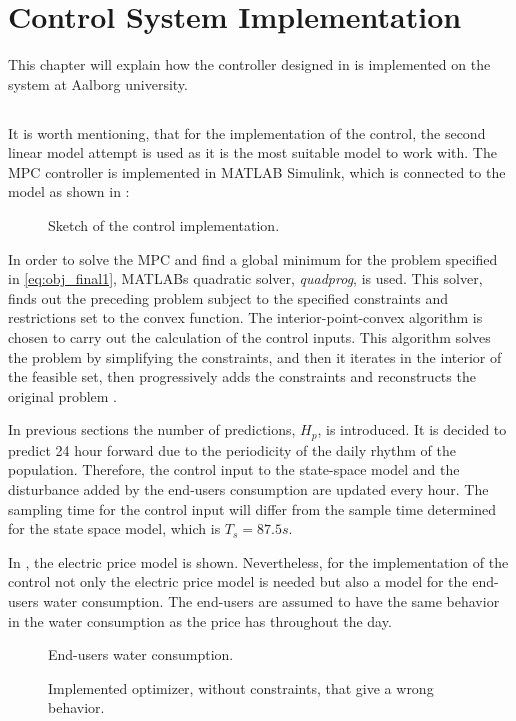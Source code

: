 \chapter{Control System Implementation}
\label{implementation_of_controller}

This chapter will explain how the controller designed in  is implemented on the system at Aalborg university.  

\section{}
It is worth mentioning, that for the implementation of the control, the second linear model attempt is used as it is the most suitable model to work with. The MPC controller is implemented in MATLAB Simulink, which is connected to the model as shown in :

\begin{figure}[H]
\centering
 
\caption{Sketch of the control implementation.}
\label{fig:control_sketch}
\end{figure}

In order to solve the MPC and find a global minimum for the problem specified in \eqref{eq:obj_final1},  MATLABs quadratic solver, \textit{quadprog}, is used. This solver, finds out the preceding problem subject to the specified constraints and restrictions set to the convex function. The interior-point-convex algorithm is chosen to carry out the calculation of the control inputs. This algorithm solves the problem by simplifying the constraints, and then it iterates in the interior of the feasible set, then progressively adds the constraints and reconstructs the original problem \cite{Convex_optimization}. 

In previous sections the number of predictions, $H_p$, is introduced. It is decided to predict 24 hour forward due to the periodicity of the daily rhythm of the population. Therefore, the control input to the state-space model and the disturbance added by the end-users consumption are updated every hour. The sampling time for the control input will differ from the sample time determined for the state space model, which is $T_s = 87.5s$. 

In , the electric price model is shown. Nevertheless, for the implementation of the control not only the electric price model is needed but also a model for the end-users water consumption. The end-users are assumed to have the same behavior in the water consumption as the price has throughout the day.

\begin{figure}[H]
\centering
 
\caption{End-users water consumption.}
\label{fig:water_consumption}
\end{figure}

\begin{figure}[H]
\centering
 
\caption{Implemented optimizer, without constraints, that give a wrong behavior.}
\label{fig:Implementation_shit}
\end{figure}

